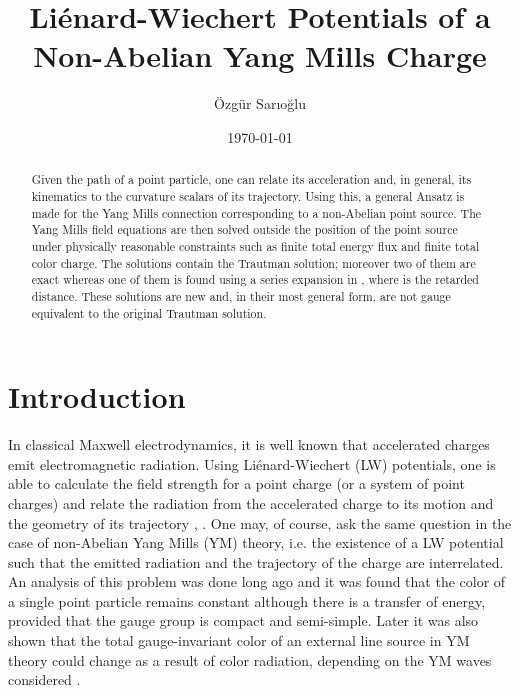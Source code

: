 \documentclass[a4paper,twocolumn,prd,showpacs,amsmath,amssymb]{revtex4}
\begin{document}
\title{Li{\' e}nard-Wiechert Potentials of a Non-Abelian Yang Mills Charge}

\author{{\" O}zg{\" u}r Sar{\i}o\u{g}lu}

\date{\today}

\begin{abstract}
Given the path of a point particle, one can relate its acceleration
and, in general, its kinematics to the curvature scalars of its trajectory.
Using this, a general Ansatz is made for the Yang Mills connection
corresponding to a non-Abelian point source. The Yang Mills field
equations are then solved outside the position of the point source
under physically reasonable constraints such as finite total energy
flux and finite total color charge. The solutions contain the Trautman
solution; moreover two of them are exact whereas one of them is found
using a series expansion in \coordHE{}, where \coordHE{} is the retarded distance.
These solutions are new and, in their most general form, are not gauge
equivalent to the original Trautman solution.
\end{abstract}


\maketitle

\section{\label{intro} Introduction}

In classical Maxwell electrodynamics, it is well known that accelerated charges
emit electromagnetic radiation. Using Li{\' e}nard-Wiechert (LW) potentials, one
is able to calculate the field strength for a point charge (or a system of point
charges) and relate the radiation from the accelerated charge to its motion and
the geometry of its trajectory \cite{bar}, \cite{jack}. One may, of course, ask
the same question in the case of non-Abelian Yang Mills (YM) theory, i.e. the
existence of a LW potential such that the emitted radiation and the trajectory
of the charge are interrelated. An analysis of this problem was done long ago
\cite{traut} and it was found that the color of a single point particle
remains constant although there is a transfer of energy, provided that the gauge
group is compact and semi-simple. Later it was also shown that the total gauge-invariant
color of an external line source in YM theory could change as a result of color
radiation, depending on the YM waves considered \cite{olt}.
\end{document}
